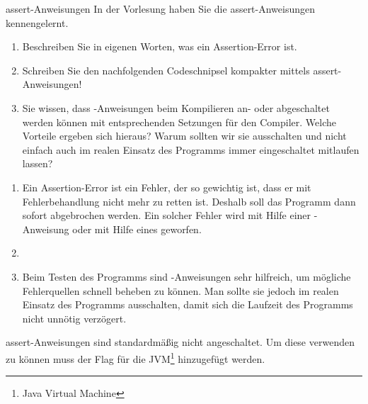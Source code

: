 \documentclass{../tuda-exercise}
\begin{document}
  \begin{task}[credit=\stars{1}{3}]{assert-Anweisungen}
    In der Vorlesung haben Sie die assert-Anweisungen kennengelernt.
    \begin{enumerate}
      \item Beschreiben Sie in eigenen Worten, was ein Assertion-Error ist.
      \item Schreiben Sie den nachfolgenden Codeschnipsel kompakter mittels assert-Anweisungen!

      

      \item  Sie wissen, dass -Anweisungen beim Kompilieren an- oder
      abgeschaltet werden können mit entsprechenden Setzungen für den Compiler. Welche Vorteile
      ergeben sich hieraus? Warum sollten wir sie ausschalten und nicht einfach auch im realen
      Einsatz des Programms immer eingeschaltet mitlaufen lassen?
    \end{enumerate}

    \begin{solution}
      \begin{enumerate}
        \item Ein Assertion-Error ist ein Fehler, der so gewichtig ist, dass er mit
        Fehlerbehandlung nicht mehr zu retten ist. Deshalb soll das Programm dann sofort
        abgebrochen werden. Ein solcher Fehler wird mit Hilfe einer
        -Anweisung oder mit Hilfe eines  geworfen.
        \item\hfill
        
        \item Beim Testen des Programms sind -Anweisungen sehr hilfreich, um
        mögliche Fehlerquellen schnell beheben zu können. Man sollte sie jedoch im realen Einsatz
        des Programms ausschalten, damit sich die Laufzeit des Programms nicht unnötig verzögert.
      \end{enumerate}
    \end{solution}

    \begin{note}[title=Information:]
      assert-Anweisungen sind standardmäßig nicht angeschaltet. Um diese verwenden zu können muss
      der Flag  für die JVM\footnote{Java Virtual Machine} hinzugefügt werden.
    \end{note}
  \end{task}
\end{document}
